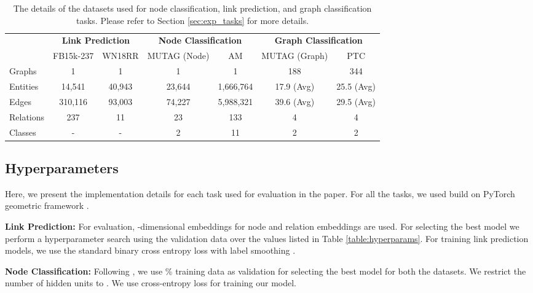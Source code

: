 \documentclass{article} \usepackage{iclr2020_conference,times}
\begin{document}
\begin{table}[t]
	\centering
	\small
	\begin{tabular}{lcccccc}
		\toprule
		&  \multicolumn{2}{c}{\bf Link Prediction} & \multicolumn{2}{c}{\bf Node Classification} & \multicolumn{2}{c}{\bf Graph Classification}\\ 
		\cmidrule(r){2-3} \cmidrule(r){4-5} \cmidrule(r){6-7} 
		& \multicolumn{1}{c}{FB15k-237} & \multicolumn{1}{c}{WN18RR} & \multicolumn{1}{c}{MUTAG (Node)} &  \multicolumn{1}{c}{AM} & \multicolumn{1}{c}{MUTAG (Graph)} & \multicolumn{1}{c}{PTC}\\
		\midrule
		Graphs   & 1 & 1 & 1 & 1 & 188 & 344 \\
		Entities   & 14,541 & 40,943 & 23,644 & 1,666,764 & 17.9 (Avg) & 25.5 (Avg)\\
		Edges 	  & 310,116 & 93,003 & 74,227 & 5,988,321 & 39.6 (Avg) & 29.5 (Avg)\\
		Relations & 237 & 11 & 23 & 133 & 4 & 4 \\
Classes   & - & - & 2 & 11 & 2 & 2\\
		\bottomrule
	\end{tabular}
	
	\caption{\label{table:rgcn_data}The details of the datasets used for node classification, link prediction, and graph classification tasks. Please refer to Section \ref{sec:exp_tasks} for more details.}
\end{table}


\subsection{Hyperparameters}
\label{sec:hyperparams}
Here, we present the implementation details for each task used for evaluation in the paper. For all the tasks, we used \method{} build on PyTorch geometric framework \citep{pytorch_geometric}. 

\noindent \textbf{Link Prediction:} For evaluation, -dimensional embeddings for node and relation embeddings are used. For selecting the best model we perform a hyperparameter search using the validation data over the values listed in Table \ref{table:hyperparams}. For training link prediction models, we use the standard binary cross entropy loss with label smoothing \cite{conve}. 

\noindent \textbf{Node Classification:} Following \citet{r_gcn}, we use \% training data as validation for selecting the best model for both the datasets. We restrict the number of hidden units to . We use cross-entropy loss for training our model. 
\end{document}
